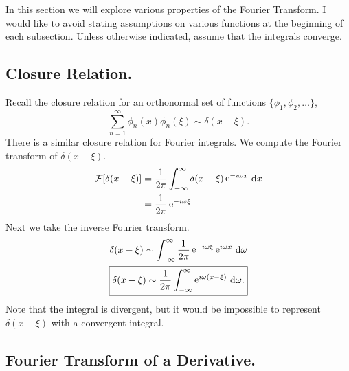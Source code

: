 In this section we will explore various properties of the Fourier Transform.
I would like to avoid stating assumptions on various functions at the beginning
of each subsection.  Unless otherwise indicated, 
assume that the integrals converge.




\subsection{Closure Relation.}




Recall the closure relation for an orthonormal set of functions
$\{\phi_1, \phi_2, \ldots \}$,
\[ 
\sum_{n = 1}^\infty \phi_n(x) \overline{\phi_n(\xi)} \sim \delta(x-\xi).
\]
There is a similar closure relation for Fourier integrals.  We compute 
the Fourier transform of $\delta(x-\xi)$.
\begin{align*}
  \mathcal{F}[\delta(x-\xi)] 
  &= \frac{1}{2\pi} \int_{-\infty}^\infty \delta(x-\xi) \mathop{\mathrm{e}}\nolimits^{-\imath \omega x}\,\mathrm{d} x 
  \\
  &= \frac{1}{2\pi} \mathop{\mathrm{e}}\nolimits^{-\imath \omega \xi}
\end{align*}
Next we take the inverse Fourier transform.
\begin{gather*}
  \delta(x-\xi) \sim \int_{-\infty}^\infty \frac{1}{2 \pi} \mathop{\mathrm{e}}\nolimits^{-\imath \omega \xi} \mathop{\mathrm{e}}\nolimits^{\imath \omega x}\,\mathrm{d} \omega
  \\
  \boxed{ 
    \delta(x-\xi) \sim \frac{1}{2 \pi} \int_{-\infty}^\infty \mathop{\mathrm{e}}\nolimits^{\imath \omega (x-\xi)}\,\mathrm{d} \omega. 
    }
\end{gather*}
Note that the integral is divergent, but it would be impossible to
represent $\delta(x-\xi)$ with a convergent integral.








\subsection{Fourier Transform of a Derivative.}



